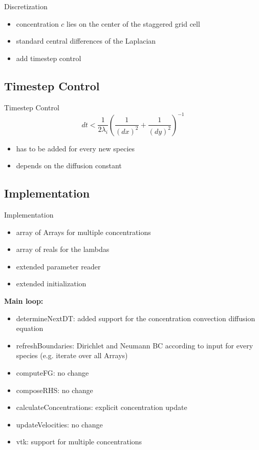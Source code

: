 \documentclass[t,mathserif]{beamer}
\begin{document}
\begin{frame}[allowframebreaks]{Discretization}
\begin{itemize}
	\item concentration $c$ lies on the center of the staggered grid cell
	\item standard central differences of the Laplacian
	\item add timestep control
\end{itemize}
\end{frame}

\subsection{Timestep Control}
\begin{frame}{Timestep Control}
	\begin{equation}
			dt < \frac{1}{2 \lambda_i} \left ( \frac{1}{(dx)^2} +
			\frac{1}{(dy)^2} \right ) ^{-1}
	\end{equation}
	\begin{itemize}
		\item has to be added for every new species
		\item depends on the diffusion constant
	\end{itemize}
\end{frame}

\subsection{Implementation}
\begin{frame}[allowframebreaks]{Implementation}
\begin{itemize}
	\item array of Arrays for multiple concentrations
	\item array of reals for the lambdas
	\item extended parameter reader
	\item extended initialization
\end{itemize}
\framebreak
\textbf{Main loop:}
\begin{itemize}
	\item determineNextDT: added support for the concentration convection diffusion equation
    \item refreshBoundaries: Dirichlet and Neumann BC according to input for every species (e.g. iterate over all Arrays)
    \item computeFG: no change
    \item composeRHS: no change
    \item calculateConcentrations: explicit concentration update
    \item updateVelocities: no change
    \item vtk: support for multiple concentrations
\end{itemize}
\end{frame}
\end{document}
